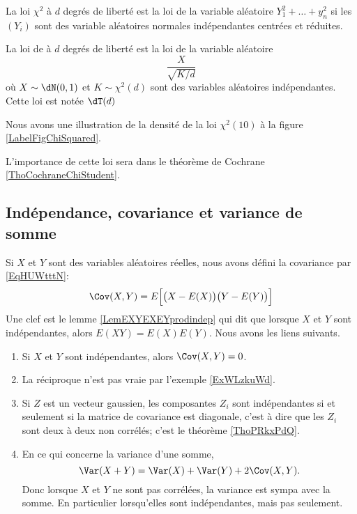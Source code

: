 \begin{definition}
    La loi \( \chi^2\) à \( d\) degrés de liberté est la loi de la variable aléatoire \( Y_1^2+\ldots+y_n^2\) si les \( (Y_i)\) sont des variable aléatoires normales indépendantes centrées et réduites.

    La loi de  à \( d\) degrés de liberté est la loi de la variable aléatoire
    \begin{equation}
        \frac{ X }{ \sqrt{K/d} }
    \end{equation}
    où \( X\sim\dN(0,1)\) et \( K\sim\chi^2(d)\) sont des variables aléatoires indépendantes. Cette loi est notée \( \dT(d)\)
\end{definition}

Nous avons une illustration de la densité de la loi \( \chi^2(10)\) à la figure \ref{LabelFigChiSquared}.
\newcommand{\CaptionFigChiSquared}{La densité de $\chi^2(10)$.}


L'importance de cette loi sera dans le théorème de Cochrane \ref{ThoCochraneChiStudent}.

\subsection{Indépendance, covariance et variance de somme}
\label{subsecTTHohur}

Si \( X\) et \( Y\) sont des variables aléatoires réelles, nous avons défini la covariance par \eqref{EqHUWtttN}:
\begin{equation}   
    \Cov(X,Y)=E\Big[ \big( X-E(X) \big)\big( Y-E(Y) \big) \Big]
\end{equation}
Une clef est le lemme \ref{LemEXYEXEYprodindep} qui dit que lorsque \( X\) et \( Y\) sont indépendantes, alors \( E(XY)=E(X)E(Y)\). Nous avons les liens suivants.
\begin{enumerate}
    \item
        Si \( X\) et \( Y\) sont indépendantes, alors \( \Cov(X,Y)=0\).
    \item
        La réciproque n'est pas vraie par l'exemple \ref{ExWLzkuWd}.
    \item
        Si \( Z\) est un vecteur gaussien, les composantes \( Z_i\) sont indépendantes si et seulement si la matrice de covariance est diagonale, c'est à dire que les \( Z_i\) sont deux à deux non corrélés; c'est le théorème \ref{ThoPRkxPdQ}.
    \item 
        En ce qui concerne la variance d'une somme,
        \begin{equation}
            \Var(X+Y)=\Var(X)+\Var(Y)+2\Cov(X,Y).
        \end{equation}
        Donc lorsque \( X\) et \( Y\) ne sont pas corrélées, la variance est sympa avec la somme. En particulier lorsqu'elles sont indépendantes, mais pas seulement.
\end{enumerate}


